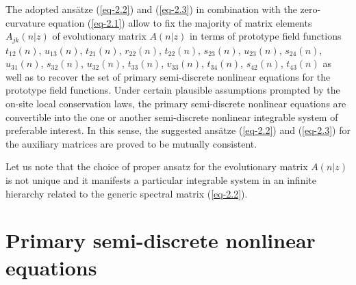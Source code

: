 \documentclass[pdftex]{sigma}
\numberwithin{equation}{section}
\begin{document}
The adopted ans\"{a}tze (\ref{eq-2.2}) and (\ref{eq-2.3}) in combination with the zero-curvature equation (\ref{eq-2.1}) allow to fix the majority of matrix elements $A_{jk}(n|z)$ of evolutionary matrix $A(n|z)$ in terms of prototype field functions $t_{12}(n)$, $u_{13}(n)$, $t_{21}(n)$, $r_{22}(n)$, $t_{22}(n)$, $s_{23}(n)$, $u_{23}(n)$, $s_{24}(n)$, $u_{31}(n)$, $s_{32}(n)$, $u_{32}(n)$, $t_{33}(n)$, $v_{33}(n)$, $t_{34}(n)$, $s_{42}(n)$, $t_{43}(n)$ as well as to recover the set of primary semi-discrete nonlinear equations for the prototype field functions. Under certain plausible assumptions prompted by the on-site local conservation laws, the primary semi-discrete nonlinear equations are convertible into the one or another semi-discrete nonlinear integrable system of preferable interest. In this sense, the suggested ans\"{a}tze (\ref{eq-2.2}) and (\ref{eq-2.3}) for the auxiliary matrices are proved to be mutually consistent.

Let us note that the choice of proper ansatz for the evolutionary matrix $A(n|z)$ is not unique and it manifests a particular integrable system in an infinite hierarchy related to the generic spectral matrix (\ref{eq-2.2}).


\section{Primary semi-discrete nonlinear equations}
\end{document}
